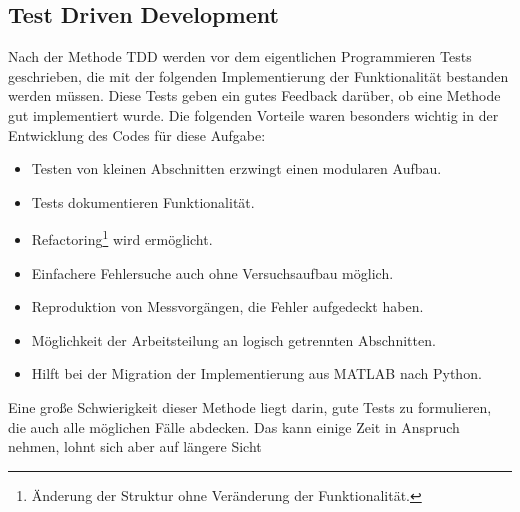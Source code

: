 \documentclass[../Report.tex]{subfiles}
\begin{document}
\subsection{Test Driven Development}
\label{subsec:code.tdd}
Nach der Methode TDD werden vor dem eigentlichen Programmieren Tests geschrieben, die mit der folgenden Implementierung der Funktionalität bestanden werden müssen. Diese Tests geben ein gutes Feedback darüber, ob eine Methode gut implementiert wurde. Die folgenden Vorteile waren besonders wichtig in der Entwicklung des Codes für diese Aufgabe:
\begin{itemize}
	\item Testen von kleinen Abschnitten erzwingt einen modularen Aufbau.
	\item Tests dokumentieren Funktionalität.
	\item Refactoring\footnote{Änderung der Struktur ohne Veränderung der Funktionalität.} wird ermöglicht.
	\item Einfachere Fehlersuche auch ohne Versuchsaufbau möglich.
	\item Reproduktion von Messvorgängen, die Fehler aufgedeckt haben.
	\item Möglichkeit der Arbeitsteilung an logisch getrennten Abschnitten.
	\item Hilft bei der Migration der Implementierung aus MATLAB nach Python.
\end{itemize}
Eine große Schwierigkeit dieser Methode liegt darin, gute Tests zu formulieren, die auch alle möglichen Fälle abdecken. Das kann einige Zeit in Anspruch nehmen, lohnt sich aber auf längere Sicht
\end{document}
